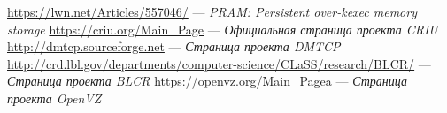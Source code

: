 

\renewcommand{\bibname}{Использованные источники и ссылки}
\begin{thebibliography}{100}
 \url{https://lwn.net/Articles/557046/} --- \emph{PRAM: Persistent over-kexec memory storage}
 \url{https://criu.org/Main_Page} --- \emph{Официальная страница проекта CRIU}
 \url{http://dmtcp.sourceforge.net} --- \emph{Страница проекта DMTCP}
 \url{http://crd.lbl.gov/departments/computer-science/CLaSS/research/BLCR/} --- \emph{Страница проекта BLCR}
 \url{https://openvz.org/Main_Pagea} --- \emph{Страница проекта OpenVZ}
\end{thebibliography}
